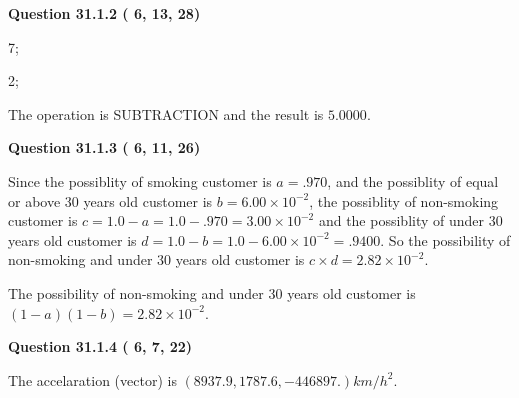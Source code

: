 \documentclass[12pt]{article}
\begin{document}
{\textbf{\Large{Question
31.1.2 
 (          6,         13,         28)
}}}
  
  
 
 
\noindent{}

7;
 
2;
 
The operation is  %
SUBTRACTION and the result is
$ %
5.0000$.
 
 
 
  
\vspace{0.2in}
  
{\textbf{\Large{Question
31.1.3 
 (          6,         11,         26)
}}}
  
  
 
 
\noindent{}

Since the possiblity of  %
smoking customer is $ a =  %
.970 $,
and the possiblity of  %
equal or above 30 years old customer is $ b =  %
6.00 \times 10^{-2} $,
the possiblity of  %
non-smoking customer is $ c = 1.0 - a = 1.0 -
.970
=  %
3.00 \times 10^{-2} $ and the possiblity of  %
under 30 years old
customer is $ d = 1.0 - b = 1.0 -  %
6.00 \times 10^{-2} =  %
.9400  $.
So the possibility of  %
 non-smoking and  %
under 30 years old
customer is $ c \times d =  %
2.82 \times 10^{-2} $.
 
 
 
 
 
\noindent{}

The possibility of  %
 non-smoking and  %
under 30 years old
customer is $ (1-a)(1-b) =  %
2.82 \times 10^{-2} $.
 
 
  
\vspace{0.2in}
  
{\textbf{\Large{Question
31.1.4 
 (          6,          7,         22)
}}}
  
  
 
 
\noindent{}
 
 
The accelaration (vector) is
$(
8937.9,
1787.6 ,
-446897.
)km/h^2.
$
 
 
 
 
 
 
\noindent{}
\end{document}
